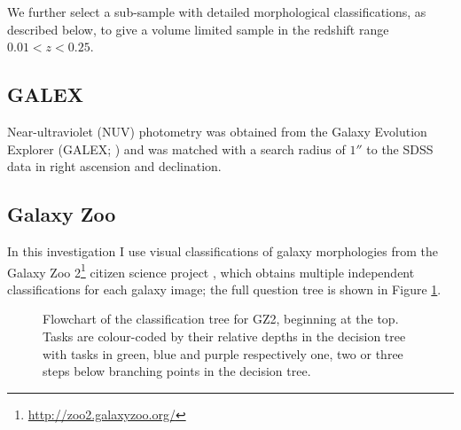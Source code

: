 We further select a sub-sample with detailed morphological classifications, as described below,  to give a volume limited sample in the redshift range $0.01 < z < 0.25$.


\subsection{GALEX}\label{sec:galexintro}

Near-ultraviolet (NUV) photometry was obtained from the Galaxy Evolution Explorer (GALEX; \citealt{Martin05}) and was matched with a search radius of $1''$ to the SDSS data in right ascension and declination. 

\subsection{Galaxy Zoo}\label{sec:GZ}

In this investigation I use visual classifications of galaxy morphologies from the Galaxy Zoo 2\footnote{\url{http://zoo2.galaxyzoo.org/}} citizen science project \citep{GZ2}, which obtains multiple independent classifications for each galaxy image; the full question tree is shown in Figure \ref{tree}.  

\begin{figure}
\caption[GZ2 classification decision tree]{Flowchart of the classification tree for GZ2, beginning at the top. Tasks are colour-coded by their relative depths in the decision tree with tasks in green, blue and purple respectively one, two or three steps below branching points in the decision tree.}
\label{tree}
\end{figure}

